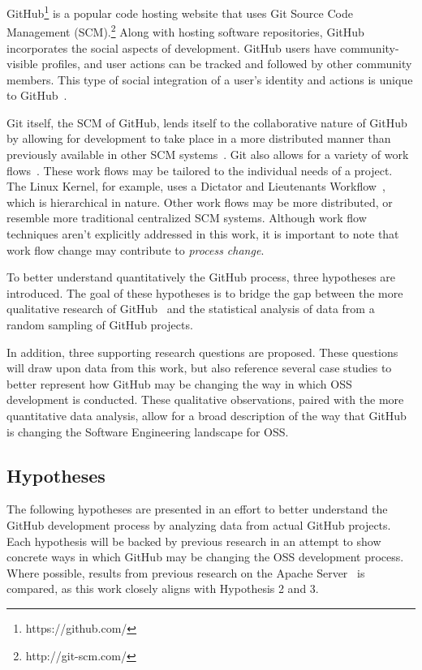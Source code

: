 \documentclass{proc}
\begin{document}
GitHub\footnote{https://github.com/} is a popular code hosting website that uses Git Source Code Management (SCM).\footnote{http://git-scm.com/} Along with hosting software repositories, GitHub incorporates the social aspects of development. GitHub users have community-visible profiles, and user actions can be tracked and followed by other community members. This type of social integration of a user's identity and actions is unique to GitHub~\cite{dabbish2012social}. 

Git itself, the SCM of GitHub, lends itself to the collaborative nature of GitHub by allowing for development to take place in a more distributed manner than previously available in other SCM systems~\cite{spinellis2012git}.
Git also allows for a variety of work flows~\cite{chacon2009pro}. These work flows may be tailored to the individual needs of a project. The Linux Kernel, for example, uses a Dictator and Lieutenants Workflow~\cite{platschekfloss}, which is hierarchical in nature. Other work flows may be more distributed, or resemble more traditional centralized SCM systems. Although work flow techniques aren't explicitly addressed in this work, it is important to note that work flow change may contribute to \textit{process change}.

To better understand quantitatively the GitHub process, three hypotheses are introduced. The goal of these hypotheses is to bridge the gap between the more qualitative research of GitHub~\cite{dabbish2012social,begel2013social} and the statistical analysis of data from a random sampling of GitHub projects.

In addition, three supporting research questions are proposed. These questions will draw upon data from this work, but also reference several case studies to better represent how GitHub may be changing the way in which OSS development is conducted. These qualitative observations, paired with the more quantitative data analysis, allow for a broad description of the way that GitHub is changing the Software Engineering landscape for OSS.

\subsection{Hypotheses}
The following hypotheses are presented in an effort to better understand the GitHub development process by analyzing data from actual GitHub projects. Each hypothesis will be backed by previous research in an attempt to show concrete ways in which GitHub may be changing the OSS development process. Where possible, results from previous research on the Apache Server~\cite{mockus2000case} is compared, as this work closely aligns with Hypothesis 2 and 3.\\
\end{document}
